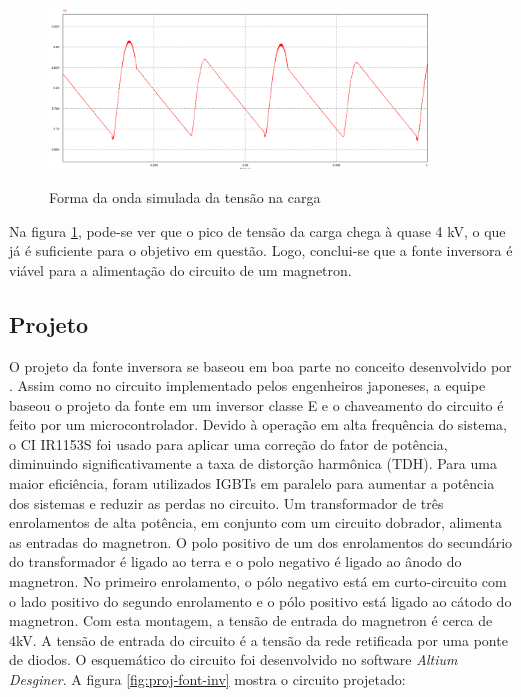 \begin{figure}[!htb]
    \centering
    \caption{Forma da onda simulada da tensão na carga}
    \includegraphics[width=0.9\textwidth]{./dados/figuras/psim2}
    \label{fig:figura-graf_sim_1}
\end{figure}

Na figura \ref{fig:figura-graf_sim_1}, pode-se ver que o pico de tensão da carga chega à quase 4 kV, o que já é suficiente para o objetivo em questão. Logo, conclui-se que a fonte inversora é viável para a alimentação do circuito de um magnetron.

\subsection{Projeto}

O projeto da fonte inversora se baseou em boa parte no conceito desenvolvido por . Assim como no circuito implementado pelos engenheiros japoneses, a equipe baseou o projeto da fonte em um inversor classe E e o chaveamento do circuito é feito por um microcontrolador. Devido à operação em alta frequência do sistema, o CI IR1153S foi usado para aplicar uma correção do fator de potência, diminuindo significativamente a taxa de distorção harmônica (TDH). Para uma maior eficiência, foram utilizados IGBTs em paralelo para aumentar a potência dos sistemas e reduzir as perdas no circuito. Um transformador de três enrolamentos de alta potência, em conjunto com um circuito dobrador, alimenta as entradas do magnetron. O polo positivo de um dos enrolamentos do secundário do transformador é ligado ao terra e o polo negativo é ligado ao ânodo do magnetron. No primeiro enrolamento, o pólo negativo está em curto-circuito com o lado positivo do segundo enrolamento e o pólo positivo está ligado ao cátodo do magnetron. Com esta montagem, a tensão de entrada do magnetron é cerca de 4kV. A tensão de entrada do circuito é a tensão da rede retificada por uma ponte de diodos. O esquemático do circuito foi desenvolvido no software \textit{Altium Desginer}. A figura \ref{fig:proj-font-inv} mostra o circuito projetado:

